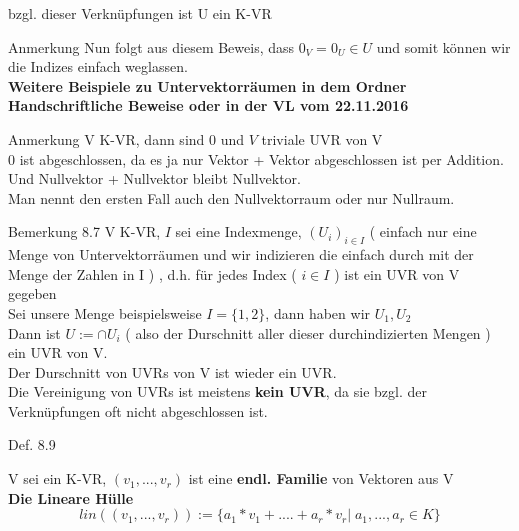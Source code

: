 \documentclass[headsepline,12pt,a4paper]{scrartcl}
\begin{document}
bzgl. dieser Verknüpfungen ist U ein K-VR \\

\item[Anmerkung]
Nun folgt aus diesem Beweis, dass $0_V = 0_U \in U$ und somit können wir die Indizes einfach weglassen. \\

\textbf{Weitere Beispiele zu Untervektorräumen in dem Ordner Handschriftliche Beweise oder in der VL vom 22.11.2016}

\item[Anmerkung]
V K-VR, dann sind ${0}$ und $V$ triviale UVR von V \\
${0}$ ist abgeschlossen, da es ja nur Vektor + Vektor abgeschlossen ist per Addition. Und Nullvektor + Nullvektor bleibt Nullvektor. \\
Man nennt den ersten Fall auch den Nullvektorraum oder nur Nullraum. \\

\item[Bemerkung 8.7] 
V K-VR, $I$ sei eine Indexmenge, $(U_i)_{i \in I}$ ( einfach nur eine Menge von Untervektorräumen und wir indizieren die einfach durch mit der Menge der Zahlen in I ) , d.h. für jedes Index ( $i \in I $ ) ist ein UVR von V gegeben \\

Sei unsere Menge beispielsweise $I=\{1,2\}$, dann haben wir $U_1,U_2$ \\

Dann ist $ U:= \cap U_i $ ( also der Durschnitt aller dieser durchindizierten Mengen ) ein UVR von V. \\

Der Durschnitt von UVRs von V ist wieder ein UVR. \\

Die Vereinigung von UVRs ist meistens \textbf{kein UVR}, da sie bzgl. der Verknüpfungen oft nicht abgeschlossen ist. \\

\newpage

\begin{center}
\item[Def. 8.9]
\end{center}
\item V sei ein K-VR, $(v_1,...,v_r)$ ist eine \textbf{endl. Familie} von Vektoren aus V  \\

\textbf{Die Lineare Hülle} $$lin((v_1,...,v_r)):=\{a_1*v_1+....+a_r*v_r | \; a_1,...,a_r \in K \}$$
\end{document}
